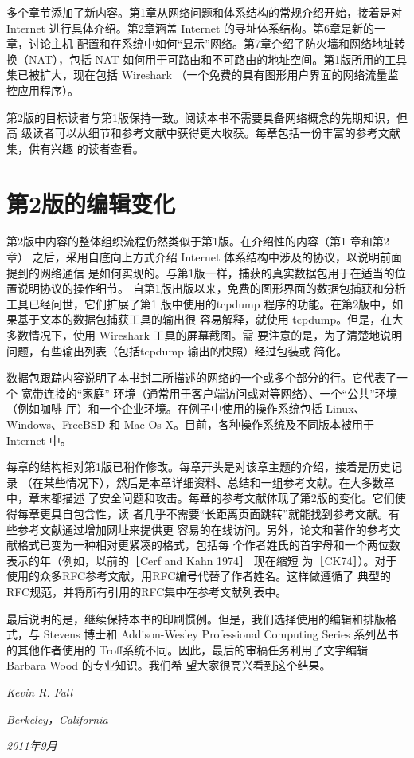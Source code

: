 多个章节添加了新内容。第1章从网络问题和体系结构的常规介绍开始，接着是对
Internet 进行具体介绍。第2章涵盖 Internet 的寻址体系结构。第6章是新的一章，讨论主机
配置和在系统中如何“显示”网络。第7章介绍了防火墙和网络地址转换（NAT），包括 NAT
如何用于可路由和不可路由的地址空间。第1版所用的工具集已被扩大，现在包括 Wireshark
（一个免费的具有图形用户界面的网络流量监控应用程序）。

第2版的目标读者与第1版保持一致。阅读本书不需要具备网络概念的先期知识，但高
级读者可以从细节和参考文献中获得更大收获。每章包括一份丰富的参考文献集，供有兴趣
的读者查看。

\section*{第2版的编辑变化}
第2版中内容的整体组织流程仍然类似于第1版。在介绍性的内容（第1 章和第2章）
之后，采用自底向上方式介绍 Internet 体系结构中涉及的协议，以说明前面提到的网络通信
是如何实现的。与第1版一样，捕获的真实数据包用于在适当的位置说明协议的操作细节。
自第1版出版以来，免费的图形界面的数据包捕获和分析工具已经问世，它们扩展了第1
版中使用的tcpdump 程序的功能。在第2版中，如果基于文本的数据包捕获工具的输出很
容易解释，就使用 tcpdump。但是，在大多数情况下，使用 Wireshark 工具的屏幕截图。需
要注意的是，为了清楚地说明问题，有些输出列表（包括tcpdump 输出的快照）经过包装或
简化。

数据包跟踪内容说明了本书封二所描述的网络的一个或多个部分的行。它代表了一个
宽带连接的“家庭” 环境（通常用于客户端访问或对等网络）、一个“公共”环境（例如咖啡
厅）和一个企业环境。在例子中使用的操作系统包括 Linux、Windows、FreeBSD 和 Mac Os
X。目前，各种操作系统及不同版本被用于 Internet 中。

每章的结构相对第1版已稍作修改。每章开头是对该章主题的介绍，接着是历史记录
（在某些情况下），然后是本章详细资料、总结和一组参考文献。在大多数章中，章末都描述
了安全问题和攻击。每章的参考文献体现了第2版的变化。它们使得每章更具自包含性，读
者几乎不需要“长距离页面跳转”就能找到参考文献。有些参考文献通过增加网址来提供更
容易的在线访问。另外，论文和著作的参考文献格式已变为一种相对更紧凑的格式，包括每
个作者姓氏的首字母和一个两位数表示的年（例如，以前的［Cerf and Kahn 1974］ 现在缩短
为［CK74］）。对于使用的众多RFC参考文献，用RFC编号代替了作者姓名。这样做遵循了
典型的RFC规范，并将所有引用的RFC集中在参考文献列表中。

最后说明的是，继续保持本书的印刷惯例。但是，我们选择使用的编辑和排版格式，与
Stevens 博士和 Addison-Wesley Professional Computing Series 系列丛书的其他作者使用的
Troff系统不同。因此，最后的审稿任务利用了文字编辑 Barbara Wood 的专业知识。我们希
望大家很高兴看到这个结果。

\begin{flushright}
    \emph{Kevin R. Fall}
\end{flushright}
\begin{flushright}
    \emph{Berkeley，California}
\end{flushright}
\begin{flushright}
    \emph{2011年9月}
\end{flushright}
